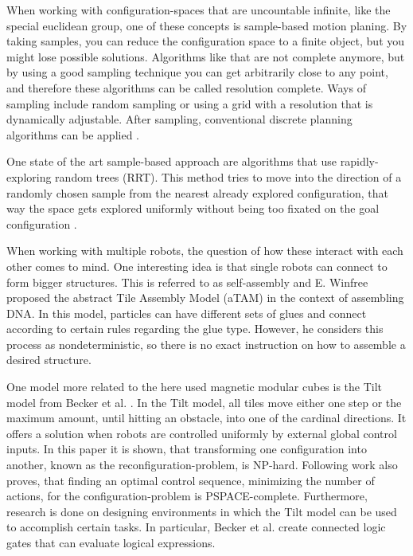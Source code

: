 When working with configuration-spaces that are uncountable infinite, like the special euclidean group, one of these concepts is sample-based motion planing.
By taking samples, you can reduce the configuration space to a finite object, but you might lose possible solutions.
Algorithms like that are not complete anymore, but by using a good sampling technique you can get arbitrarily close to any point, and therefore these algorithms can be called resolution complete.
Ways of sampling include random sampling or using a grid with a resolution that is dynamically adjustable.
After sampling, conventional discrete planning algorithms can be applied \cite{LaValle2006}.

One state of the art sample-based approach are algorithms that use rapidly-exploring random trees (RRT).
This method tries to move into the direction of a randomly chosen sample from the nearest already explored configuration, that way the space gets explored uniformly without being too fixated on the goal configuration \cite{lavalle1998,lavalle2001}.

When working with multiple robots, the question of how these interact with each other comes to mind.
One interesting idea is that single robots can connect to form bigger structures.
This is referred to as self-assembly and E. Winfree \cite{winfree1998} proposed the abstract Tile Assembly Model (aTAM) in the context of assembling DNA.
In this model, particles can have different sets of glues and connect according to certain rules regarding the glue type.
However, he considers this process as nondeterministic, so there is no exact instruction on how to assemble a desired structure.

One model more related to the here used magnetic modular cubes is the Tilt model from Becker et al. \cite{Becker2014_SP}.
In the Tilt model, all tiles move either one step or the maximum amount, until hitting an obstacle, into one of the cardinal directions.
It offers a solution when robots are controlled uniformly by external global control inputs.
In this paper it is shown, that transforming one configuration into another, known as the reconfiguration-problem, is NP-hard.
Following work \cite{Becker2014} also proves, that finding an optimal control sequence, minimizing the number of actions, for the configuration-problem is PSPACE-complete.
Furthermore, research is done on designing environments in which the Tilt model can be used to accomplish certain tasks.
In particular, Becker et al. \cite{Becker2014} create connected logic gates that can evaluate logical expressions.

